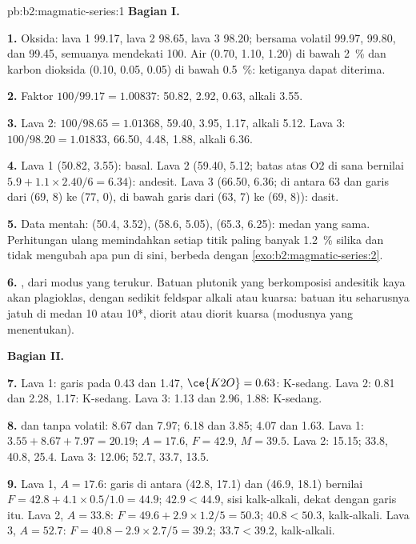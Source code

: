 \begin{solution}{pb:b2:magmatic-series:1}
\noindent\textbf{Bagian I.}

\textbf{1.} Oksida: lava 1 99.17, lava 2 98.65, lava 3 98.20; bersama volatil
99.97, 99.80, dan 99.45, semuanya mendekati 100. Air (0.70, 1.10, 1.20) di bawah
\qty{2}{\percent} dan karbon dioksida (0.10, 0.05, 0.05) di bawah \qty{0.5}{\percent}: ketiganya
dapat diterima.

\textbf{2.} Faktor $100/99.17 = 1.00837$:  50.82,  2.92, 
0.63, alkali 3.55.

\textbf{3.} Lava 2: $100/98.65 = 1.01368$,  59.40,  3.95, 
1.17, alkali 5.12. Lava 3: $100/98.20 = 1.01833$,  66.50,  4.48,
 1.88, alkali 6.36.

\textbf{4.} Lava 1 (50.82, 3.55): basal. Lava 2 (59.40, 5.12; batas atas O2
di sana bernilai $5.9 + 1.1\times2.40/6 = 6.34$): andesit. Lava 3 (66.50, 6.36; di antara 63
dan garis dari (69, 8) ke (77, 0), di bawah garis dari (63, 7) ke (69, 8)): dasit.

\textbf{5.} Data mentah: (50.4, 3.52), (58.6, 5.05), (65.3, 6.25): medan yang sama.
Perhitungan ulang memindahkan setiap titik paling banyak \qty{1.2}{\percent} silika dan tidak mengubah
apa pun di sini, berbeda dengan \cref{exo:b2:magmatic-series:2}.

\textbf{6.} , dari modus yang terukur. Batuan plutonik yang berkomposisi
andesitik kaya akan plagioklas, dengan sedikit feldspar alkali atau kuarsa: batuan itu seharusnya
jatuh di medan 10 atau 10*, diorit atau diorit kuarsa (modusnya yang menentukan).

\noindent\textbf{Bagian II.}

\textbf{7.} Lava 1: garis pada 0.43 dan 1.47, $\ce{K2O} = 0.63$: K-sedang. Lava 2: 0.81
dan 2.28, 1.17: K-sedang. Lava 3: 1.13 dan 2.96, 1.88: K-sedang.

\textbf{8.}  dan  tanpa volatil: 8.67 dan 7.97; 6.18 dan 3.85; 4.07
dan 1.63. Lava 1: $3.55 + 8.67 + 7.97 = 20.19$; $A = 17.6$, $F = 42.9$, $M = 39.5$.
Lava 2: 15.15; 33.8, 40.8, 25.4. Lava 3: 12.06; 52.7, 33.7, 13.5.

\textbf{9.} Lava 1, $A = 17.6$: garis di antara (42.8, 17.1) dan (46.9, 18.1) bernilai
$F = 42.8 + 4.1\times0.5/1.0 = 44.9$; $42.9 < 44.9$, sisi kalk-alkali, dekat dengan
garis itu. Lava 2, $A = 33.8$: $F = 49.6 + 2.9\times1.2/5 = 50.3$; $40.8 < 50.3$,
kalk-alkali. Lava 3, $A = 52.7$: $F = 40.8 - 2.9\times2.7/5 = 39.2$; $33.7 < 39.2$,
kalk-alkali.


\end{solution}
